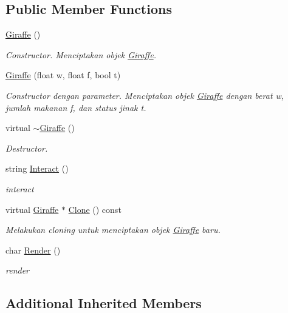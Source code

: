 \subsection*{Public Member Functions}
\begin{DoxyCompactItemize}
\item 
\hyperlink{classGiraffe_a4a396bd3e634243c1740916b71197168}{Giraffe} ()
\begin{DoxyCompactList}\small\item\em Constructor. Menciptakan objek \hyperlink{classGiraffe}{Giraffe}. \end{DoxyCompactList}\item 
\hyperlink{classGiraffe_aa04be26d10955712062e0c0dbf8e6d8f}{Giraffe} (float w, float f, bool t)
\begin{DoxyCompactList}\small\item\em Constructor dengan parameter. Menciptakan objek \hyperlink{classGiraffe}{Giraffe} dengan berat w, jumlah makanan f, dan status jinak t. \end{DoxyCompactList}\item 
virtual \hyperlink{classGiraffe_a1d099c4a2c87fbac26e5bcb33084dcb4}{$\sim$\+Giraffe} ()
\begin{DoxyCompactList}\small\item\em Destructor. \end{DoxyCompactList}\item 
string \hyperlink{classGiraffe_ad73e5ee5fc62f709c52a1cab68f2a1f3}{Interact} ()
\begin{DoxyCompactList}\small\item\em interact \end{DoxyCompactList}\item 
virtual \hyperlink{classGiraffe}{Giraffe} $\ast$ \hyperlink{classGiraffe_aa29f8f77477a64fc72f814b7f225c94f}{Clone} () const 
\begin{DoxyCompactList}\small\item\em Melakukan cloning untuk menciptakan objek \hyperlink{classGiraffe}{Giraffe} baru. \end{DoxyCompactList}\item 
char \hyperlink{classGiraffe_a64dccf030fdb54de9fd37f8381c64271}{Render} ()
\begin{DoxyCompactList}\small\item\em render \end{DoxyCompactList}\end{DoxyCompactItemize}
\subsection*{Additional Inherited Members}


